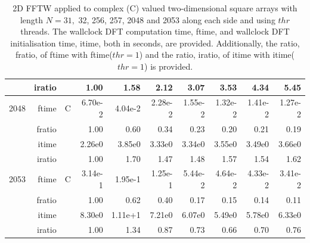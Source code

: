 \documentclass[a4paper]{article}
\begin{document}
\begin{table}[htbp]
\begin{center}
\begin{small}
\begin{tabular}{|r|r|r|r|r|r|r|r|r|r|}
     & iratio & &       1.00 &   1.58 &   2.12 &   3.07 &   3.53 &   4.34 &   5.45      \\ \hline 
  2048  & ftime & C  &  6.70e-2 &   4.04e-2 &   2.28e-2 &   1.55e-2 &   1.32e-2 &   1.41e-2 &   1.27e-2   \\ 
      & fratio & &      1.00 &   0.60 &   0.34 &   0.23 &   0.20 &   0.21 &   0.19     \\ 
     & itime & &        2.26e0 &   3.85e0 &   3.33e0 &   3.34e0 &   3.55e0 &   3.49e0 &   3.66e0     \\ 
     & iratio & &       1.00 &   1.70 &   1.47 &   1.48 &   1.57 &   1.54 &   1.62      \\ \hline 
  2053  & ftime & C  &  3.14e-1 &   1.95e-1 &   1.25e-1 &   5.44e-2 &   4.64e-2 &   4.33e-2 &   3.41e-2   \\ 
      & fratio & &      1.00 &   0.62 &   0.40 &   0.17 &   0.15 &   0.14 &   0.11     \\ 
     & itime & &        8.30e0 &   1.11e+1 &   7.21e0 &   6.07e0 &   5.49e0 &   5.78e0 &   6.33e0     \\ 
     & iratio & &       1.00 &   1.34 &   0.87 &   0.73 &   0.66 &   0.70 &   0.76      \\ \hline
\end{tabular}
\caption{2D FFTW applied to complex (C) valued two-dimensional square arrays with length $N=31,$ 32, 256, 257, 2048 and 2053 along each side and using $thr$ threads. The wallclock DFT computation time, ftime, and wallclock DFT initialisation time, itime, both in seconds, are provided. Additionally,  the ratio, fratio, of ftime  with ftime($thr=1$) and the ratio, iratio, of itime  with itime($thr=1$) is provided. }\label{Tbl:FFTW2dc}
\end{small}
\end{center}
\end{table}
\end{document}
